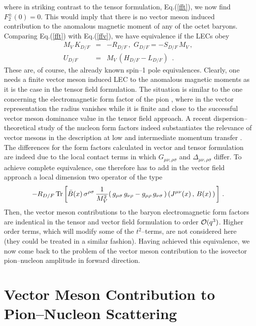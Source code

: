 where in striking contrast to the tensor formulation, Eq.(\ref{fft}),
we now find $F_2^{\pm} (0) =0$. This would imply that there is no
vector meson induced contribution to the anomalous magnetic moment of
any of the octet baryons. Comparing Eq.(\ref{fft}) with
Eq.(\ref{ffv}), we have equivalence if the LECs obey
\begin{eqnarray}
 M_V \, K_{D/F}& = & - R_{D/F}  \, , \, \, G_{D/F} = - S_{D/F} \,  M_V
\, , \nonumber \\
U_{D/F} & = & M_V \,(H_{D/F}- L_{D/F})   \, \, \, .
\label{equiv3}
\end{eqnarray}
These are, of course, the already known spin--1 pole
equivalences. Clearly, one needs a finite vector meson induced LEC to
the anomalous magnetic moments as it is the case in the tensor field
formulation. The situation is similar to the one concerning the
electromagnetic form factor of the pion \cite{reso1}, where in the
vector representation the radius vanishes while it is finite and close
to the successful vector meson dominance value in the tensor field
approach. A recent dispersion--theoretical study of the nucleon form
factors indeed substantiates the relevance of vector mesons
in the description at low and intermediate momentum
transfer \cite{mmd}. The differences for the form factors calculated in
vector and tensor formulation are indeed due to the local contact
terms in which $G_{\mu \nu , \rho\sigma}$ and $\Delta_{\mu \nu ,
  \rho\sigma}$ differ. To achieve complete equivalence, one therefore has
to add in the vector field approach a local dimension two
operator of the type
\begin{equation}
-R_{D/F} \, {\rm Tr} \, \biggl[ \bar{B}(x) \, \sigma^{\rho \sigma} \,
\frac{1}{M_V^2} (\, g_{\mu \sigma} \, g_{\nu \rho} - g_{\mu \rho} \,
g_{\nu \sigma} \, ) \, ( J^{\mu \nu}(x) \, ,\, B(x) \, ) \, \biggr] \,
\, .
\label{localff}
\end{equation}
Then, the vector meson contributions to the baryon electromagnetic form
factors are indentical in the tensor and vector field formulation to
order ${\cal O}(q^3)$. Higher order terms, which will modify some of the
$t^2$--terms, are not considered here (they could be treated in a
similar fashion).  Having achieved this equivalence, we now come
back to the problem of the vector meson contribution to the
isovector pion--nucleon amplitude in forward direction.

\vfill

\section{Vector Meson Contribution to Pion--Nucleon Scattering }

